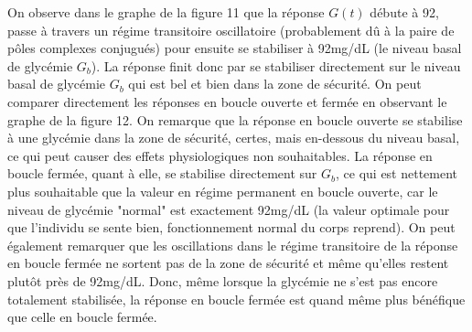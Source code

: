 \documentclass[11pt, a4paper]{article}
\begin{document}
\noindent On observe dans le graphe de la figure 11 que la réponse $G(t)$ débute à 92, passe à travers un régime transitoire oscillatoire (probablement dû à la paire de pôles complexes conjugués) pour ensuite se stabiliser à 92mg/dL (le niveau basal de glycémie $G_b$). La réponse finit donc par se stabiliser directement sur le niveau basal de glycémie $G_b$ qui est bel et bien dans la zone de sécurité. On peut comparer directement les réponses en boucle ouverte et fermée en observant le graphe de la figure 12. On remarque que la réponse en boucle ouverte se stabilise à une glycémie dans la zone de sécurité, certes, mais en-dessous du niveau basal, ce qui peut causer des effets physiologiques non souhaitables. La réponse en boucle fermée, quant à elle, se stabilise directement sur $G_b$, ce qui est nettement plus souhaitable que la valeur en régime permanent en boucle ouverte, car le niveau de glycémie "normal" est exactement 92mg/dL (la valeur optimale pour que l'individu se sente bien, fonctionnement normal du corps reprend). On peut également remarquer que les oscillations dans le régime transitoire de la réponse en boucle fermée ne sortent pas de la zone de sécurité et même qu'elles restent plutôt près de 92mg/dL. Donc, même lorsque la glycémie ne s'est pas encore totalement stabilisée, la réponse en boucle fermée est quand même plus bénéfique que celle en boucle fermée.
\end{document}
